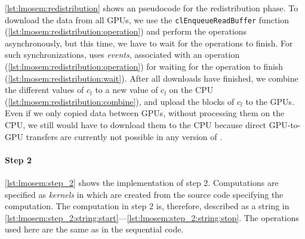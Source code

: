\autoref{lst:lmosem:redistribution} shows an \OpenCL pseudocode for the redistribution phase.
To download the data from all GPUs, we use the \texttt{clEnqueueReadBuffer} function (\ref{lst:lmosem:redistribution:operation}) and perform the operations asynchronously, but this time, we have to wait for the operations to finish.
For such synchronizations, \OpenCL uses \emph{events}, associated with an operation (\ref{lst:lmosem:redistribution:operation}) for waiting for the operation to finish (\autoref{lst:lmosem:redistribution:wait}).
After all downloads have finished, we combine the different values of $c_l$ to a new value of $c_l$ on the CPU (\autoref{lst:lmosem:redistribution:combine}), and upload the blocks of $c_l$ to the GPUs.
Even if we only copied data between GPUs, without processing them on the CPU, we still would have to download them to the CPU because direct GPU-to-GPU transfers are currently not possible in any version of \OpenCL.

\paragraph{Step 2}
\autoref{lst:lmosem:step_2} shows the implementation of step 2.
Computations are specified as \emph{kernels} in \OpenCL which are created from the source code specifying the computation.
The computation in step 2 is, therefore, described as a string in \autoref{lst:lmosem:step_2:string:start}---\autoref{lst:lmosem:step_2:string:stop}.
The operations used here are the same as in the sequential code.

